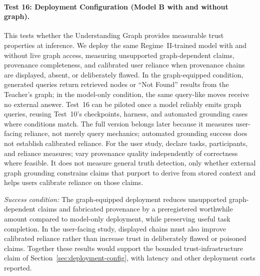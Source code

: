 \documentclass[11pt]{article}
\begin{document}
\paragraph{Test 16: Deployment Configuration (Model B with and without graph).}
This tests whether the Understanding Graph provides measurable
trust properties at inference. We deploy the same Regime~II-trained model with
and without live graph access, measuring unsupported graph-dependent claims,
provenance completeness, and calibrated user reliance when provenance chains
are displayed, absent, or deliberately flawed.
In the graph-equipped condition, generated queries return retrieved nodes or
``Not Found'' results from the Teacher's graph; in the model-only condition,
the same query-like moves receive no external answer.
Test~16 can be piloted once a model reliably emits graph queries, reusing
Test~10's checkpoints, harness, and automated grounding cases where conditions
match. The full version belongs later because it measures user-facing reliance,
not merely query mechanics; automated grounding success does not establish
calibrated reliance. For the user study, declare tasks, participants, and reliance measures;
vary provenance quality independently of correctness where feasible. It does not measure general truth detection,
only whether external graph grounding constrains claims that purport to derive
from stored context and helps users calibrate reliance on those claims.

\emph{Success condition:} The graph-equipped deployment reduces unsupported graph-dependent claims and fabricated provenance by a preregistered worthwhile amount compared to model-only deployment, while preserving useful task completion. In the user-facing study, displayed chains must also improve calibrated reliance rather than increase trust in deliberately flawed or poisoned claims. Together these results would support the bounded trust-infrastructure claim of Section~\ref{sec:deployment-config}, with latency and other deployment costs reported.
\end{document}
